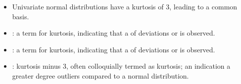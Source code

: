 \begin{itemize}
\begin{itemize}
\begin{itemize}
          \begin{itemize}
            \item Univariate normal distributions have a kurtosis of 3, leading to a common basis.
            \item {}: a term for  kurtosis, indicating that a  of deviations or  is observed.
            \item {}: a term for  kurtosis, indicating that a  of deviations or  is observed. 
            \item {}: kurtosis minus 3, often colloquially termed as kurtosis; an indication a greater degree outliers compared to a normal distribution. 
          \end{itemize}
      \end{itemize} 
  \end{itemize}
  

\end{itemize}
